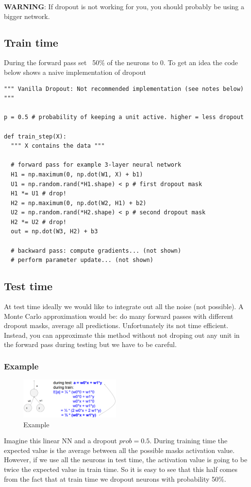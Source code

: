 \textbf{WARNING}: If dropout is not working for you, you should probably be using a bigger network.

\subsection*{Train time}
During the forward pass set ~50\% of the neurons to 0. To get an idea the code below shows a naive implementation of dropout 
\begin{lstlisting}[frame=single] 
""" Vanilla Dropout: Not recommended implementation (see notes below) """

p = 0.5 # probability of keeping a unit active. higher = less dropout

def train_step(X):
  """ X contains the data """

  # forward pass for example 3-layer neural network
  H1 = np.maximum(0, np.dot(W1, X) + b1)
  U1 = np.random.rand(*H1.shape) < p # first dropout mask
  H1 *= U1 # drop!
  H2 = np.maximum(0, np.dot(W2, H1) + b2)
  U2 = np.random.rand(*H2.shape) < p # second dropout mask
  H2 *= U2 # drop!
  out = np.dot(W3, H2) + b3

  # backward pass: compute gradients... (not shown)
  # perform parameter update... (not shown)
 \end{lstlisting}

\subsection*{Test time}
At test time ideally we would like to integrate out all the noise (not possible). A Monte Carlo approximation would be: do many forward passes with different dropout masks, average all predictions. Unfortunately its not time efficient. Instead, you can approximate this method without not droping out any unit in the forward pass during testing but we have to be careful. 

\subsubsection*{Example}
\begin{figure}[!htb]
  \centering
  \includegraphics[width=0.45\textwidth]{Images/dropout/2.png}
  \caption{Example}
\end{figure}
Imagine this linear NN and a dropout $prob = 0.5$. During training time the expected value is the average between all the possible masks activation value. However, if we use all the neurons in test time, the activation value is going to be twice the expected value in train time. So it is easy to see that this half comes from the fact that at train time we dropout neurons with probability 50\%.

